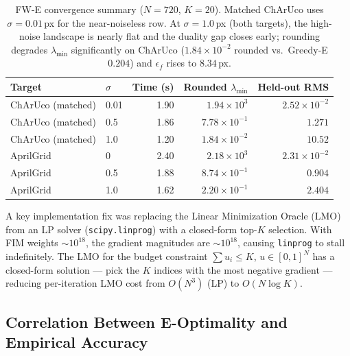 \documentclass[11pt]{article}
\begin{document}
\begin{table}[ht]
\centering
\caption{FW-E convergence summary ($N{=}720$, $K{=}20$).
Matched ChArUco uses $\sigma{=}0.01$\,px for the near-noiseless row.
At $\sigma{=}1.0$\,px (both targets), the high-noise landscape is nearly flat
and the duality gap closes early; rounding degrades $\lambda_{\min}$
significantly on ChArUco ($1.84\!\times\!10^{-2}$ rounded vs.\ Greedy-E $0.204$)
and $\epsilon_f$ rises to $8.34$\,px.}
\label{tab:fw_convergence}
\setlength{\tabcolsep}{5pt}
\begin{tabular}{llrrr}
\toprule
Target & $\sigma$ & Time (s) & Rounded $\lambda_{\min}$ & Held-out RMS\\
\midrule
ChArUco (matched) & 0.01 & 1.90 & $1.94\!\times\!10^{3}$  & $2.52\!\times\!10^{-2}$ \\
ChArUco (matched) & 0.5  & 1.86 & $7.78\!\times\!10^{-1}$ & $1.271$ \\
ChArUco (matched) & 1.0  & 1.20 & $1.84\!\times\!10^{-2}$ & $10.52$ \\
AprilGrid         & 0    & 2.40 & $2.18\!\times\!10^{3}$  & $2.31\!\times\!10^{-2}$ \\
AprilGrid         & 0.5  & 1.88 & $8.74\!\times\!10^{-1}$ & $0.904$ \\
AprilGrid         & 1.0  & 1.62 & $2.20\!\times\!10^{-1}$ & $2.404$ \\
\bottomrule
\end{tabular}
\end{table}

A key implementation fix was replacing the Linear Minimization Oracle (LMO)
from an LP solver (\texttt{scipy.linprog}) with a closed-form top-$K$
selection.
With FIM weights $\sim10^{18}$, the gradient magnitudes are $\sim10^{18}$,
causing \texttt{linprog} to stall indefinitely.
The LMO for the budget constraint $\sum u_i \leq K$, $u\in[0,1]^N$ has a
closed-form solution --- pick the $K$ indices with the most negative gradient
--- reducing per-iteration LMO cost from $O(N^3)$ (LP) to $O(N\log K)$.

\subsection{Correlation Between E-Optimality and Empirical Accuracy}
\label{subsec:correlation}
\end{document}
